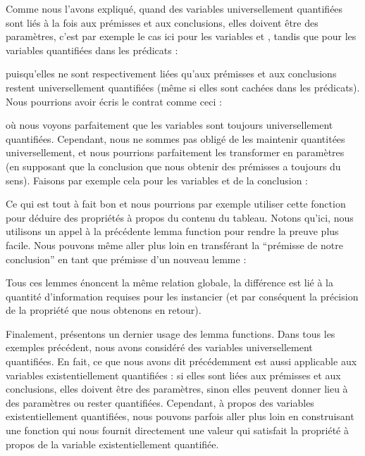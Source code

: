 Comme nous l'avons expliqué, quand des variables universellement quantifiées
sont liés à la fois aux prémisses et aux conclusions, elles doivent être des
paramètres, c'est par exemple le cas ici pour les variables 
et , tandis que pour les variables quantifiées dans les
prédicats :





puisqu'elles ne sont respectivement liées qu'aux prémisses et aux conclusions
restent universellement quantifiées (même si elles sont cachées dans les
prédicats). Nous pourrions avoir écris le contrat comme ceci :





où nous voyons parfaitement que les variables sont toujours universellement
quantifiées. Cependant, nous ne sommes pas obligé de les maintenir quantitées
universellement, et nous pourrions parfaitement les transformer en paramètres
(en supposant que la conclusion que nous obtenir des prémisses a toujours du
sens). Faisons par exemple cela pour les variables  et
 de la conclusion :




Ce qui est tout à fait bon et nous pourrions par exemple utiliser cette fonction
pour déduire des propriétés à propos du contenu du tableau. Notons qu'ici, nous
utilisons un appel à la précédente lemma function pour rendre la preuve plus
facile. Nous pouvons même aller plus loin en transférant la ``prémisse de notre
conclusion'' en tant que prémisse d'un nouveau lemme :





Tous ces lemmes énoncent la même relation globale, la différence est lié à la
quantité d'information requises pour les instancier (et par conséquent la 
précision de la propriété que nous obtenons en retour).


Finalement, présentons un dernier usage des lemma functions. Dans tous les 
exemples précédent, nous avons considéré des variables universellement quantifiées.
En fait, ce que nous avons dit précédemment est aussi applicable aux variables
existentiellement quantifiées : si elles sont liées aux prémisses et aux
conclusions, elles doivent être des paramètres, sinon elles peuvent donner lieu
à des paramètres ou rester quantifiées. Cependant, à propos des variables
existentiellement quantifiées, nous pouvons parfois aller plus loin en construisant
une fonction qui nous fournit directement une valeur qui satisfait la propriété
à propos de la variable existentiellement quantifiée.



